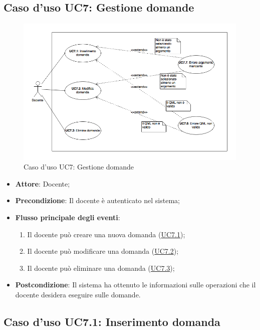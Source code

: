 \documentclass[12pt,a4paper]{article}
\begin{document}
\subsection{Caso d'uso UC7: Gestione domande}
\begin{figure}[H]
	\centering
	\includegraphics[width=\textwidth]{diagramUC7.png}
	\caption{Caso d'uso UC7: Gestione domande}\label{fig:UC7} 
\end{figure}
\begin{itemize}

\item \textbf{Attore}: Docente; 
\item \textbf{Precondizione}: Il docente è autenticato nel sistema;

\item \textbf{Flusso principale degli eventi}:
\begin{enumerate}
	\item Il docente può creare una nuova domanda (\hyperlink{UC7.1}{UC7.1});
	\item Il docente può modificare una domanda (\hyperlink{UC7.2}{UC7.2});
	\item Il docente può eliminare una domanda (\hyperlink{UC7.3}{UC7.3});
	
\end{enumerate}
\item \textbf{Postcondizione}: Il sistema ha ottenuto le informazioni sulle operazioni che il docente desidera eseguire sulle domande.
\end{itemize}
\hypertarget{UC7.1}{}
\subsection{Caso d'uso UC7.1: Inserimento domanda}
\end{document}
